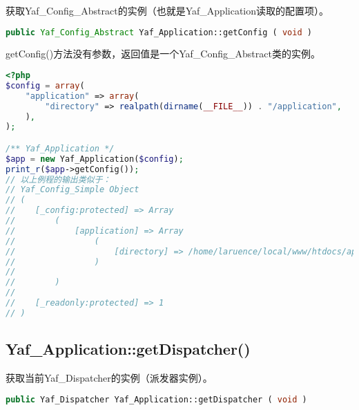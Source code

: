 获取Yaf\_Config\_Abstract的实例（也就是Yaf\_Application读取的配置项）。






\begin{lstlisting}[language=PHP]
public Yaf_Config_Abstract Yaf_Application::getConfig ( void )
\end{lstlisting}

getConfig()方法没有参数，返回值是一个Yaf\_Config\_Abstract类的实例。

\begin{lstlisting}[language=PHP]
<?php
$config = array(
    "application" => array(
        "directory" => realpath(dirname(__FILE__)) . "/application",
    ),
);

/** Yaf_Application */
$app = new Yaf_Application($config);
print_r($app->getConfig());
// 以上例程的输出类似于：
// Yaf_Config_Simple Object
// (
//    [_config:protected] => Array
//        (
//            [application] => Array
//                (
//                    [directory] => /home/laruence/local/www/htdocs/application
//                )
//
//        )
//
//    [_readonly:protected] => 1
// )
\end{lstlisting}






\subsection{Yaf\_Application::getDispatcher()}

获取当前Yaf\_Dispatcher的实例（派发器实例）。



\begin{lstlisting}[language=PHP]
public Yaf_Dispatcher Yaf_Application::getDispatcher ( void )
\end{lstlisting}


